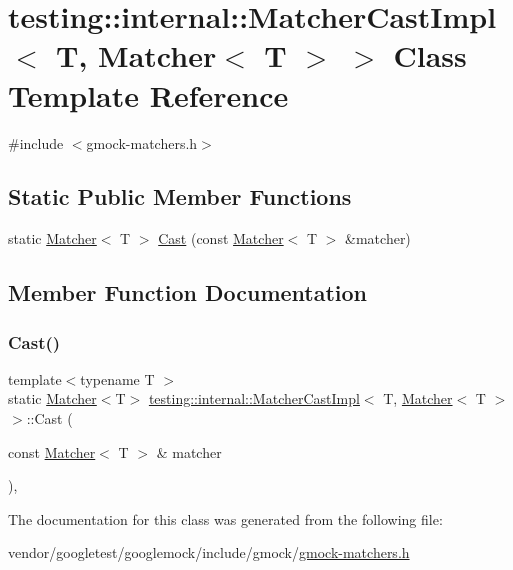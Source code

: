 \hypertarget{classtesting_1_1internal_1_1_matcher_cast_impl_3_01_t_00_01_matcher_3_01_t_01_4_01_4}{}\section{testing\+:\+:internal\+:\+:Matcher\+Cast\+Impl$<$ T, Matcher$<$ T $>$ $>$ Class Template Reference}
\label{classtesting_1_1internal_1_1_matcher_cast_impl_3_01_t_00_01_matcher_3_01_t_01_4_01_4}


{\ttfamily \#include $<$gmock-\/matchers.\+h$>$}

\subsection*{Static Public Member Functions}
\begin{DoxyCompactItemize}
\item 
static \hyperlink{classtesting_1_1_matcher}{Matcher}$<$ T $>$ \hyperlink{classtesting_1_1internal_1_1_matcher_cast_impl_3_01_t_00_01_matcher_3_01_t_01_4_01_4_ac945132186fcbe0e0d2d8c207d730026}{Cast} (const \hyperlink{classtesting_1_1_matcher}{Matcher}$<$ T $>$ \&matcher)
\end{DoxyCompactItemize}


\subsection{Member Function Documentation}
\mbox{\label{classtesting_1_1internal_1_1_matcher_cast_impl_3_01_t_00_01_matcher_3_01_t_01_4_01_4_ac945132186fcbe0e0d2d8c207d730026}} 
\subsubsection{\texorpdfstring{Cast()}{Cast()}}
{\footnotesize\ttfamily template$<$typename T $>$ \\
static \hyperlink{classtesting_1_1_matcher}{Matcher}$<$T$>$ \hyperlink{classtesting_1_1internal_1_1_matcher_cast_impl}{testing\+::internal\+::\+Matcher\+Cast\+Impl}$<$ T, \hyperlink{classtesting_1_1_matcher}{Matcher}$<$ T $>$ $>$\+::Cast (\begin{DoxyParamCaption}\item[{const \hyperlink{classtesting_1_1_matcher}{Matcher}$<$ T $>$ \&}]{matcher }\end{DoxyParamCaption})\hspace{0.3cm}{\ttfamily [inline]}, {\ttfamily [static]}}



The documentation for this class was generated from the following file\+:\begin{DoxyCompactItemize}
\item 
vendor/googletest/googlemock/include/gmock/\hyperlink{gmock-matchers_8h}{gmock-\/matchers.\+h}\end{DoxyCompactItemize}

